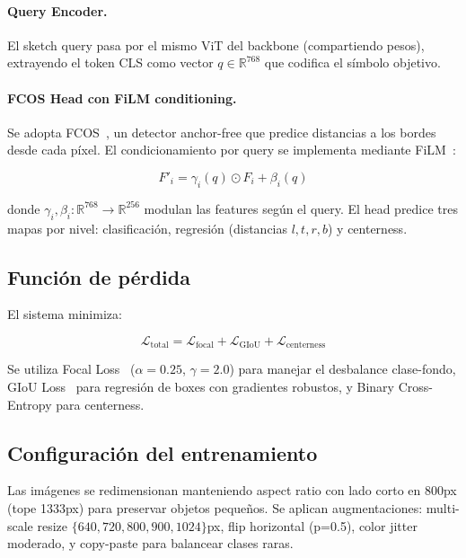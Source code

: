 \documentclass[11pt]{article}
\begin{document}
\paragraph{Query Encoder.}
El sketch query pasa por el mismo ViT del backbone (compartiendo pesos), extrayendo el token CLS como vector $q \in \mathbb{R}^{768}$ que codifica el símbolo objetivo.

\paragraph{FCOS Head con FiLM conditioning.}
Se adopta FCOS~\cite{tian2019fcos}, un detector anchor-free que predice distancias a los bordes desde cada píxel. El condicionamiento por query se implementa mediante FiLM~\cite{perez2018film}:

\begin{equation}
F'_i = \gamma_i(q) \odot F_i + \beta_i(q)
\end{equation}

donde $\gamma_i, \beta_i : \mathbb{R}^{768} \rightarrow \mathbb{R}^{256}$ modulan las features según el query. El head predice tres mapas por nivel: clasificación, regresión (distancias $l, t, r, b$) y centerness.


\subsection{Función de pérdida}

El sistema minimiza:

\begin{equation}
\mathcal{L}_{\text{total}} = \mathcal{L}_{\text{focal}} + \mathcal{L}_{\text{GIoU}} + \mathcal{L}_{\text{centerness}}
\end{equation}

Se utiliza Focal Loss~\cite{lin2017focal} ($\alpha=0.25$, $\gamma=2.0$) para manejar el desbalance clase-fondo, GIoU Loss~\cite{rezatofighi2019generalized} para regresión de boxes con gradientes robustos, y Binary Cross-Entropy para centerness.


\subsection{Configuración del entrenamiento}

Las imágenes se redimensionan manteniendo aspect ratio con lado corto en 800px (tope 1333px) para preservar objetos pequeños. Se aplican augmentaciones: multi-scale resize $\{640, 720, 800, 900, 1024\}$px, flip horizontal (p=0.5), color jitter moderado, y copy-paste para balancear clases raras.
\end{document}
